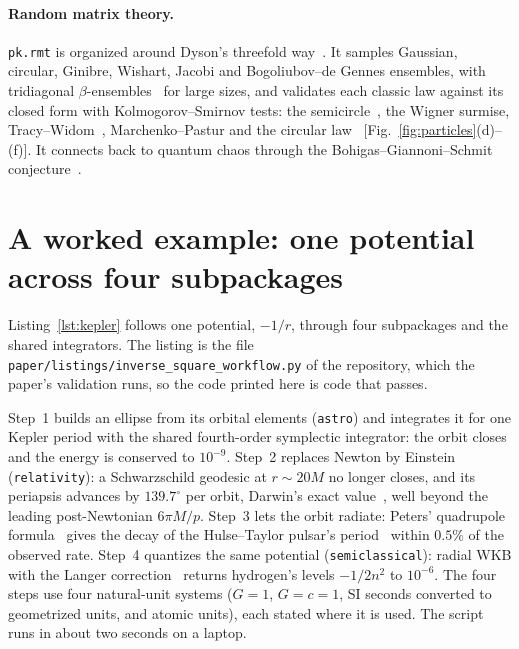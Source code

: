 \documentclass[11pt,a4paper]{article}
\newcommand{\code}[1]{\texttt{#1}}
\begin{document}
\paragraph{Random matrix theory.} \code{pk.rmt} is organized around Dyson's
threefold way~\cite{dyson1962}. It samples Gaussian, circular, Ginibre,
Wishart, Jacobi and Bogoliubov--de Gennes ensembles, with tridiagonal
$\beta$-ensembles~\cite{dumitriu2002} for large sizes, and validates each
classic law against its closed form with Kolmogorov--Smirnov tests: the
semicircle~\cite{wigner1955}, the Wigner surmise, Tracy--Widom~\cite{tracy1994},
Marchenko--Pastur and the circular law~\cite{ginibre1965}
[Fig.~\ref{fig:particles}(d)--(f)]. It connects back to quantum chaos
through the Bohigas--Giannoni--Schmit conjecture~\cite{bohigas1984}.

\section{A worked example: one potential across four subpackages}
\label{sec:example}

Listing~\ref{lst:kepler} follows one potential, $-1/r$, through four
subpackages and the shared integrators. The listing is the file
\code{paper/listings/inverse\_square\_workflow.py} of the repository, which
the paper's validation runs, so the code printed here is code that passes.



Step~1 builds an ellipse from its orbital elements (\code{astro}) and
integrates it for one Kepler period with the shared fourth-order symplectic
integrator: the orbit closes and the energy is conserved to $10^{-9}$.
Step~2 replaces Newton by Einstein (\code{relativity}): a Schwarzschild
geodesic at $r\sim 20M$ no longer closes, and its periapsis advances by
$139.7^\circ$ per orbit, Darwin's exact value~\cite{darwin1959}, well
beyond the leading post-Newtonian $6\pi M/p$. Step~3 lets the orbit
radiate: Peters' quadrupole formula~\cite{peters1964} gives the decay of
the Hulse--Taylor pulsar's period~\cite{hulse1975} within $0.5\%$ of the
observed rate. Step~4 quantizes the same potential (\code{semiclassical}):
radial WKB with the Langer correction~\cite{langer1937} returns hydrogen's
levels $-1/2n^2$ to $10^{-6}$. The four steps use four natural-unit
systems ($G=1$, $G=c=1$, SI seconds converted to geometrized units, and
atomic units), each stated where it is used. The script runs in about two
seconds on a laptop.
\end{document}
